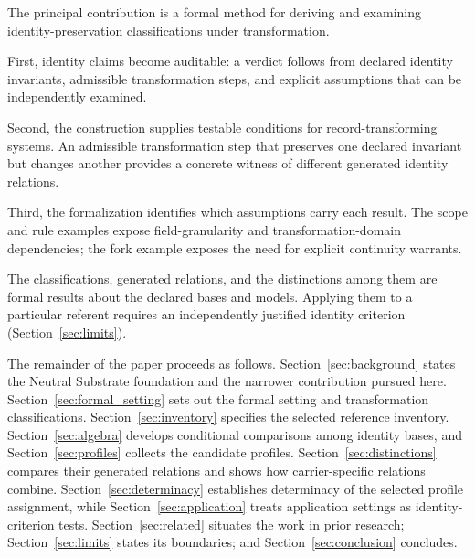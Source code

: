 The principal contribution is a formal method for
deriving and examining identity-preservation classifications
under transformation.

First, identity claims become auditable: a verdict follows
from declared identity invariants, admissible transformation
steps, and explicit assumptions that can be independently
examined.

Second, the construction supplies testable conditions for
record-transforming systems.
An admissible transformation step that preserves
one declared invariant but changes another
provides a concrete witness of different generated
identity relations.

Third, the formalization identifies which assumptions
carry each result.
The scope and rule examples expose
field-granularity and transformation-domain dependencies;
the fork example exposes the need for explicit
continuity warrants.

The classifications, generated relations, and the distinctions among
them are formal results about the declared bases and models.
Applying them to a particular referent requires an independently
justified identity criterion (Section~\ref{sec:limits}).

The remainder of the paper proceeds as follows.
Section~\ref{sec:background} states the Neutral Substrate foundation
and the narrower contribution pursued here.
Section~\ref{sec:formal_setting} sets out the formal setting and
transformation classifications.
Section~\ref{sec:inventory} specifies the selected reference inventory.
Section~\ref{sec:algebra} develops conditional comparisons among identity
bases, and Section~\ref{sec:profiles} collects the candidate profiles.
Section~\ref{sec:distinctions} compares their generated relations and
shows how carrier-specific relations combine.
Section~\ref{sec:determinacy} establishes determinacy of the selected
profile assignment, while Section~\ref{sec:application} treats
application settings as identity-criterion tests.
Section~\ref{sec:related} situates the work in prior research;
Section~\ref{sec:limits} states its boundaries; and
Section~\ref{sec:conclusion} concludes.
